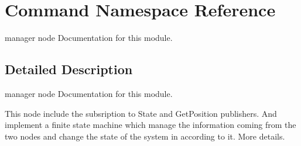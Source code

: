\hypertarget{namespaceCommand}{}\section{Command Namespace Reference}
\label{namespaceCommand}


manager node Documentation for this module.  




\subsection{Detailed Description}
manager node Documentation for this module. 

This node include the subsription to State and Get\+Position publishers. And implement a finite state machine which manage the information coming from the two nodes and change the state of the system in according to it. More details. 